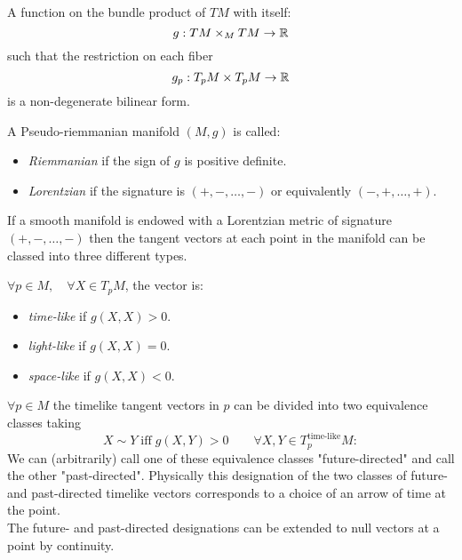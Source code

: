 \documentclass[a4paper,12pt]{scrartcl}    %
\begin{document}
	\begin{definition}[Metric]
		A function on the bundle product of $TM$ with itself: $$g: TM \times_M TM \rightarrow \mathbb{R}$$ such that the restriction on each fiber $$g_p: T_pM \times T_pM \rightarrow \mathbb{R} $$ is a non-degenerate bilinear form.
	\end{definition}
	
	\begin{notationfix}
		A Pseudo-riemmanian manifold $(M,g)$ is called:
		 \begin{itemize}
		 	\item \emph{Riemmanian} if the sign of $g$ is positive definite.%
		 	\item \emph{Lorentzian} if the signature is $(+, -, \ldots,- )$ or equivalently $(-,+,\ldots,+)$.
		 \end{itemize}
	\end{notationfix}

	\begin{observation}
		If a smooth manifold is endowed with a Lorentzian metric of signature $(+, -, \ldots, -)$ then the tangent vectors at each point in the manifold can be classed into three different types. 
		\begin{notationfix}
			$\forall p \in M, \quad \forall X \in T_pM$, the vector is:
			\begin{itemize}
				\item \emph{time-like} if $g(X,X)>0$.
				\item \emph{light-like} if $g(X,X)=0$.
				\item \emph{space-like} if $g(X,X)<0$.
			\end{itemize}
		\end{notationfix}
	\end{observation}

	\begin{observation}
		$\forall p\in M$ the timelike tangent vectors in $p$ can be divided into two equivalence classes taking
		\begin{displaymath}
			X \sim Y \; \textrm{iff} \; g(X,Y)>0 \qquad \forall X,Y \in T^\textrm{time-like}_pM:
		\end{displaymath}
		We can (arbitrarily) call one of these equivalence classes "future-directed" and call the other "past-directed". Physically this designation of the two classes of future- and past-directed timelike vectors corresponds to a choice of an arrow of time at the point. 
		\\
		The future- and past-directed designations can be extended to null vectors at a point by continuity.
	\end{observation}
	
\end{document}
